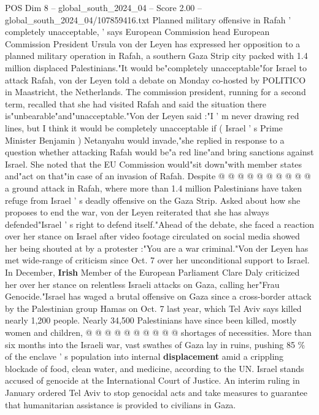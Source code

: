 \begin{textsample}{POS Dim 8 – global\_south\_2024\_04 – Score 2.00 – global\_south\_2024\_04/107859416.txt}  \label{ex:f8_pos_419}
Planned military offensive in Rafah ' completely unacceptable, ' says European Commission head European Commission President Ursula von der Leyen has expressed her opposition to a planned military operation in Rafah, a southern Gaza Strip city packed with 1.4 million displaced Palestinians."It would be"completely unacceptable"for Israel to attack Rafah, von der Leyen told a debate on Monday co-hosted by POLITICO in Maastricht, the Netherlands.
The commission president, running for a second term, recalled that she had visited Rafah and said the situation there is"unbearable"and"unacceptable."Von der Leyen said :"I ' m never drawing red lines, but I think it would be completely unacceptable if ( Israel ' s Prime Minister Benjamin ) Netanyahu would invade,"she replied in response to a question whether attacking Rafah would be"a red line"and bring sanctions against Israel.
She noted that the EU Commission would"sit down"with member states and"act on that"in case of an invasion of Rafah.
Despite @ @ @ @ @ @ @ @ @ @ a ground attack in Rafah, where more than 1.4 million Palestinians have taken refuge from Israel ' s deadly offensive on the Gaza Strip.
Asked about how she proposes to end the war, von der Leyen reiterated that she has always defended"Israel ' s right to defend itself."Ahead of the debate, she faced a reaction over her stance on Israel after video footage circulated on social media showed her being shouted at by a protester :"You are a war criminal."Von der Leyen has met wide-range of criticism since Oct. 7 over her unconditional support to Israel.
In December, \textbf{Irish} Member of the European Parliament Clare Daly criticized her over her stance on relentless Israeli attacks on Gaza, calling her"Frau Genocide."Israel has waged a brutal offensive on Gaza since a cross-border attack by the Palestinian group Hamas on Oct. 7 last year, which Tel Aviv says killed nearly 1,200 people.
Nearly 34,500 Palestinians have since been killed, mostly women and children, @ @ @ @ @ @ @ @ @ @ shortages of necessities.
More than six months into the Israeli war, vast swathes of Gaza lay in ruins, pushing 85 \% of the enclave ' s population into internal \textbf{displacement} amid a crippling blockade of food, clean water, and medicine, according to the UN.
Israel stands accused of genocide at the International Court of Justice.
An interim ruling in January ordered Tel Aviv to stop genocidal acts and take measures to guarantee that humanitarian assistance is provided to civilians in Gaza.

\end{textsample}
